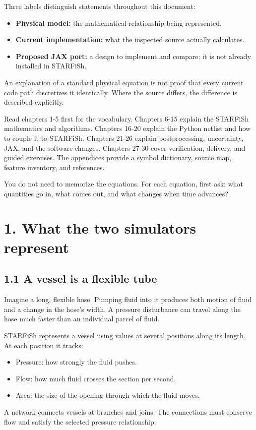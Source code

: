 \documentclass[11pt,a4paper]{article}
\begin{document}
Three labels distinguish statements throughout this document:


\begin{itemize}
\item \textbf{Physical model:} the mathematical relationship being represented.


\item \textbf{Current implementation:} what the inspected source actually calculates.


\item \textbf{Proposed JAX port:} a design to implement and compare; it is not already installed in STARFiSh.


\end{itemize}
An explanation of a standard physical equation is not proof that every current code path discretizes it identically. Where the source differs, the difference is described explicitly.

Read chapters 1-5 first for the vocabulary. Chapters 6-15 explain the STARFiSh mathematics and algorithms. Chapters 16-20 explain the Python netlist and how to couple it to STARFiSh. Chapters 21-26 explain postprocessing, uncertainty, JAX, and the software changes. Chapters 27-30 cover verification, delivery, and guided exercises. The appendices provide a symbol dictionary, source map, feature inventory, and references.

You do not need to memorize the equations. For each equation, first ask: what quantities go in, what comes out, and what changes when time advances?

\clearpage
\section{1. What the two simulators represent}
\subsection{1.1 A vessel is a flexible tube}
Imagine a long, flexible hose. Pumping fluid into it produces both motion of fluid and a change in the hose's width. A pressure disturbance can travel along the hose much faster than an individual parcel of fluid.

STARFiSh represents a vessel using values at several positions along its length. At each position it tracks:


\begin{itemize}
\item Pressure: how strongly the fluid pushes.


\item Flow: how much fluid crosses the section per second.


\item Area: the size of the opening through which the fluid moves.


\end{itemize}
A network connects vessels at branches and joins. The connections must conserve flow and satisfy the selected pressure relationship.
\end{document}
